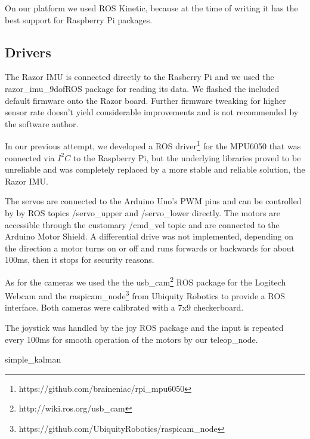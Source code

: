 \documentclass[class=article, crop=false]{standalone}
\begin{document}
On our platform we used ROS Kinetic, because at the time of writing it has the best support for Raspberry Pi packages.

\subsection{Drivers}\label{subsec:drivers}
The Razor IMU is connected directly to the Rasberry Pi and we used the razor\_imu\_9dof\footnotemark ROS package for reading its data. We flashed the included default firmware onto the Razor board. Further firmware tweaking for higher sensor rate doesn't yield considerable improvements and is not recommended by the software author.


In our previous attempt, we developed a ROS driver\footnote{https://github.com/braineniac/rpi_mpu6050} for the MPU6050 that was connected via $ I^2C $ to the Raspberry Pi, but the underlying libraries proved to be unreliable and was completely replaced by a more stable and reliable solution, the Razor IMU.

The servos are connected to the Arduino Uno's PWM pins and can be controlled by by ROS topics /servo\_upper and /servo\_lower directly. The motors are accessible through the customary /cmd\_vel topic and are connected to the Arduino Motor Shield. A differential drive was not implemented, depending on the direction a motor turns on or off and runs forwards or backwards for about 100ms, then it stops for security reasons.

As for the cameras we used the the usb\_cam\footnote{http://wiki.ros.org/usb_cam} ROS package for the Logitech Webcam and the raspicam\_node\footnote{https://github.com/UbiquityRobotics/raspicam_node} from Ubiquity Robotics to provide a ROS interface. Both cameras were calibrated with a 7x9 checkerboard.

The joystick was handled by the joy ROS package and the input is repeated every 100ms for smooth operation of the motors by our teleop\_node.


{simple_kalman}

\end{document}
